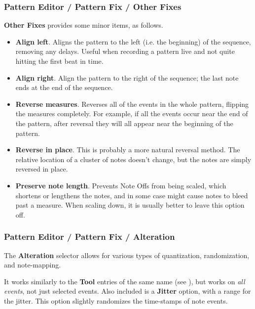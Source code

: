 \subsubsection{Pattern Editor / Pattern Fix / Other Fixes}
\label{subsubsection:patterns_fix_other_fixes}

   \textbf{Other Fixes} provides some minor items, as follows.

   \begin{itemize}
      \item \textbf{Align left}.
         Aligns the pattern to the left (i.e. the beginning)
         of the sequence, removing any delays.
         Useful when recording a pattern live and not quite
         hitting the first beat in time.
      \item \textbf{Align right}.
         Align the pattern to the right of the sequence;
         the last note ends at the end of the sequence.
      \item \textbf{Reverse measures}.
         Reverses all of the events in the whole pattern, flipping the measures
         completely.  For example, if all the events occur near the end of the
         pattern, after reversal they will all appear near the beginning of the
         pattern.
      \item \textbf{Reverse in place}.
         This is probably a more natural reversal method.
         The relative location of a cluster of notes doesn't change, but the
         notes are simply reversed in place.
      \item \textbf{Preserve note length}.
         Prevents Note Offs from being scaled, which shortens or lengthens the
         notes, and in some case might cause notes to bleed past a measure.
         When scaling down, it is usually better to leave this option off.
   \end{itemize}

\subsubsection{Pattern Editor / Pattern Fix / Alteration}
\label{subsubsection:patterns_fix_alteration}

   The \textbf{Alteration} selector allows for various types of
   quantization, randomization, and note-mapping.

   It works similarly to the \textbf{Tool} entries of the
   same name (see ),
   but works on \textsl{all events}, not just selected events.
   Also included is a \textbf{Jitter} option, with a range for the jitter.
   This option slightly randomizes the time-stamps of note events.

